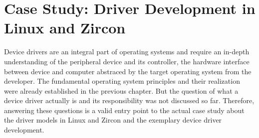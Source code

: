 
\chapter{Case Study: Driver Development in Linux and Zircon}\label{ch:case-study}
Device drivers are an integral part of operating systems and require an in-depth understanding of the peripheral device and its controller, the hardware interface between device and computer abstraced by the target operating system from the developer.
The fundamental operating system principles and their realization were already established in the previous chapter.
But the question of what a device driver actually is and its responsibility was not discussed so far.
Therefore, answering these questions is a valid entry point to the actual case study about the driver models in Linux and Zircon and the exemplary device driver development.

